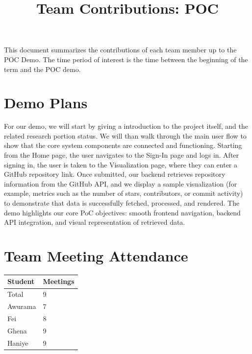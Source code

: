 \documentclass{article}
\title{Team Contributions: POC\\\progname}
\author{\authname}
\date{}
\begin{document}
\maketitle

This document summarizes the contributions of each team member up to the POC
Demo.  The time period of interest is the time between the beginning of the term
and the POC demo.

\section{Demo Plans}
For our demo, we will start by giving a introduction to the project itself, and the related research portion status. We will than walk through the main user flow to show that the core system components are connected and functioning. Starting from the Home page, the user navigates to the Sign-In page and logs in. After signing in, the user is taken to the Visualization page, where they can enter a GitHub repository link. Once submitted, our backend retrieves repository information from the GitHub API, and we display a sample visualization (for example, metrics such as the number of stars, contributors, or commit activity) to demonstrate that data is successfully fetched, processed, and rendered. The demo highlights our core PoC objectives: smooth frontend navigation, backend API integration, and visual representation of retrieved data.

\section{Team Meeting Attendance}


\begin{table}[H]
\centering
\begin{tabular}{ll}
\toprule
\textbf{Student} & \textbf{Meetings}\\
\midrule
Total & 9\\
Awurama & 7\\
Fei & 8\\
Ghena & 9\\
Haniye & 9\\
\bottomrule
\end{tabular}
\end{table}
\end{document}
